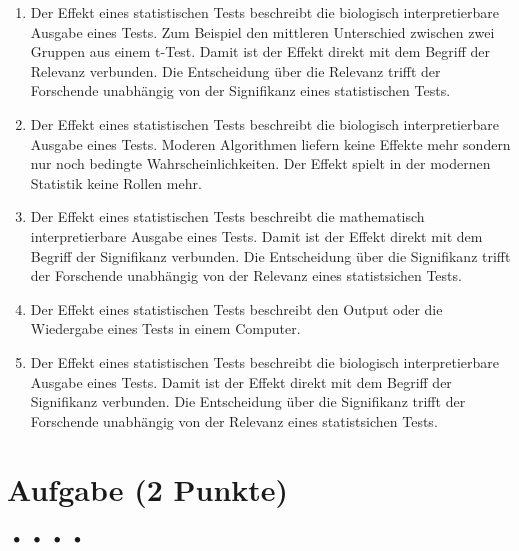 \documentclass[a4paper, 9pt]{scrartcl}\usepackage[]{graphicx}\usepackage[]{xcolor}
\begin{document}
\begin{enumerate}
\item [\textbf{A} \msquare] Der Effekt eines statistischen Tests beschreibt die biologisch interpretierbare Ausgabe eines Tests. Zum Beispiel den mittleren Unterschied zwischen zwei Gruppen aus einem t-Test. Damit ist der Effekt direkt mit dem Begriff der Relevanz verbunden. Die Entscheidung über die Relevanz trifft der Forschende unabhängig von der Signifikanz eines statistischen Tests.
\item [\textbf{B} \msquare] Der Effekt eines statistischen Tests beschreibt die biologisch interpretierbare Ausgabe eines Tests. Moderen Algorithmen liefern keine Effekte mehr sondern nur noch bedingte Wahrscheinlichkeiten. Der Effekt spielt in der modernen Statistik keine Rollen mehr.
\item [\textbf{C} \msquare] Der Effekt eines statistischen Tests beschreibt die mathematisch interpretierbare Ausgabe eines Tests. Damit ist der Effekt direkt mit dem Begriff der Signifikanz verbunden. Die Entscheidung über die Signifikanz trifft der Forschende unabhängig von der Relevanz eines statistsichen Tests.
\item [\textbf{D} \msquare] Der Effekt eines statistischen Tests beschreibt den Output oder die Wiedergabe eines Tests in einem Computer.
\item [\textbf{E} \msquare] Der Effekt eines statistischen Tests beschreibt die biologisch interpretierbare Ausgabe eines Tests. Damit ist der Effekt direkt mit dem Begriff der Signifikanz verbunden. Die Entscheidung über die Signifikanz trifft der Forschende unabhängig von der Relevanz eines statistsichen Tests.
\end{enumerate}

\section{Aufgabe \hfill (2 Punkte)}

\ifcollection
\begin{flushright}
\tiny\vspace{-2Ex}
\textbf{\examinhaltstart}
\exammodulemathstat $\;\bullet$
\exammodulestat $\;\bullet$
\exammodulestatbbv $\;\bullet$
\exammodulestatversuch $\;\bullet$
\exammodulebiostat
\vspace{-1Ex}
\end{flushright}
\fi
\end{document}
